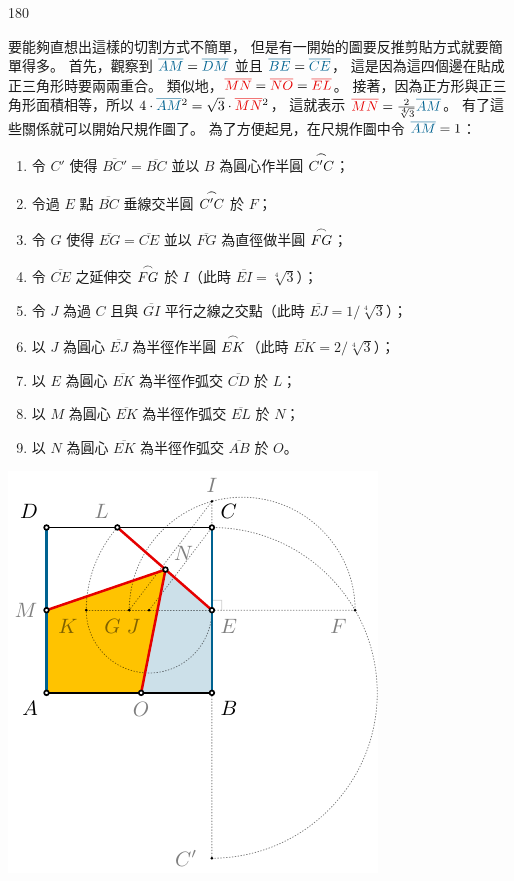 \documentclass{article}
\begin{document}
\noindent
\begin{turn}{180}
	\begin{solution*}
		要能夠直想出這樣的切割方式不簡單，
		但是有一開始的圖要反推剪貼方式就要簡單得多。
		首先，觀察到 $\blue{\overline{AM}}=\blue{\overline{DM}}$ 並且 $\blue{\overline{BE}}=\blue{\overline{CE}}$，
		這是因為這四個邊在貼成正三角形時要兩兩重合。
		類似地，$\red{\overline{MN}}=\red{\overline{NO}}=\red{\overline{EL}}$。
		接著，因為正方形與正三角形面積相等，所以
		$4\cdot\blue{\overline{AM}}^2 = \sqrt{3}\cdot\red{\overline{MN}}^2$，
		這就表示
		$\red{\overline{MN}} = \frac{2}{\sqrt[4]{3}} \blue{\overline{AM}}$。
		有了這些關係就可以開始尺規作圖了。
		為了方便起見，在尺規作圖中令 $\blue{\overline{AM}}=1$：\\
		\begin{minipage}{0.58\textwidth}
			\begin{enumerate}
				\item 令 $C'$ 使得 $\overline{BC'}=\overline{BC}$ 並以 $B$ 為圓心作半圓 $\overarc{C'C}$；
				\item 令過 $E$ 點 $\overline{BC}$ 垂線交半圓 $\overarc{C'C}$ 於 $F$；
				\item 令 $G$ 使得 $\overline{EG}=\overline{CE}$ 並以 $\overline{FG}$ 為直徑做半圓 $\overarc{FG}$；
				\item 令 $\overline{CE}$ 之延伸交 $\overarc{FG}$ 於 $I$（此時 $\overline{EI}=\sqrt[4]{3}$）；
				\item 令 $J$ 為過 $C$ 且與 $\overline{GI}$ 平行之線之交點（此時 $\overline{EJ}=1/\sqrt[4]{3}$）；
				\item 以 $J$ 為圓心 $\overline{EJ}$ 為半徑作半圓 $\overarc{EK}$（此時 $\overline{EK}=2/\sqrt[4]{3}$）；
				\item 以 $E$ 為圓心 $\overline{EK}$ 為半徑作弧交 $\overline{CD}$ 於 $L$；
				\item 以 $M$ 為圓心 $\overline{EK}$ 為半徑作弧交 $\overline{EL}$ 於 $N$；
				\item 以 $N$ 為圓心 $\overline{EK}$ 為半徑作弧交 $\overline{AB}$ 於 $O$。
			\end{enumerate}
		\end{minipage}
		\begin{minipage}{0.35\textwidth}
			\includegraphics[scale=1]{figures/figure-example_construction.pdf}

\end{minipage}
\end{solution*}
\end{turn}
\end{document}
